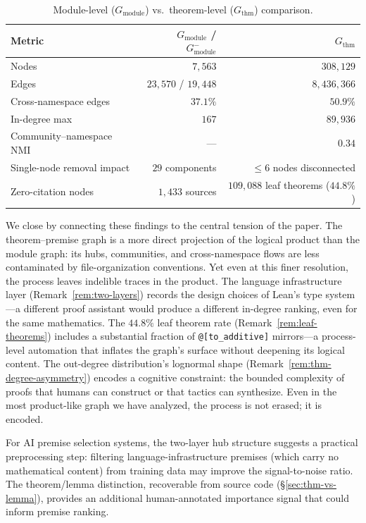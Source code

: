 \begin{table}[ht]
\centering
\caption{Module-level ($G_{\mathrm{module}}$) vs.\ theorem-level ($G_{\mathrm{thm}}$) comparison.}
\label{tab:thm-vs-module}
\begin{tabular}{lrr}
\toprule
Metric & $G_{\mathrm{module}}$ / $G_{\mathrm{module}}^{-}$ & $G_{\mathrm{thm}}$ \\
\midrule
Nodes                        & $7{,}563$          & $308{,}129$ \\
Edges                        & $23{,}570$ / $19{,}448$ & $8{,}436{,}366$ \\
Cross-namespace edges         & $37.1\%$           & $50.9\%$ \\
In-degree max                & $167$              & $89{,}936$ \\
Community--namespace NMI     & ---                & $0.34$ \\
Single-node removal impact   & $29$ components    & $\le 6$ nodes disconnected \\
Zero-citation nodes          & $1{,}433$ sources  & $109{,}088$ leaf theorems ($44.8\%$) \\
\bottomrule
\end{tabular}
\end{table}

We close by connecting these findings to the central tension of the paper. The theorem--premise graph is a more direct projection of the logical product than the module graph: its hubs, communities, and cross-namespace flows are less contaminated by file-organization conventions. Yet even at this finer resolution, the process leaves indelible traces in the product. The language infrastructure layer (Remark~\ref{rem:two-layers}) records the design choices of Lean's type system---a different proof assistant would produce a different in-degree ranking, even for the same mathematics. The $44.8\%$ leaf theorem rate (Remark~\ref{rem:leaf-theorems}) includes a substantial fraction of \texttt{@[to\_additive]} mirrors---a process-level automation that inflates the graph's surface without deepening its logical content. The out-degree distribution's lognormal shape (Remark~\ref{rem:thm-degree-asymmetry}) encodes a cognitive constraint: the bounded complexity of proofs that humans can construct or that tactics can synthesize. Even in the most product-like graph we have analyzed, the process is not erased; it is encoded.


For AI premise selection systems, the two-layer hub structure suggests a practical preprocessing step: filtering language-infrastructure premises (which carry no mathematical content) from training data may improve the signal-to-noise ratio. The theorem/lemma distinction, recoverable from source code (\S\ref{sec:thm-vs-lemma}), provides an additional human-annotated importance signal that could inform premise ranking.
